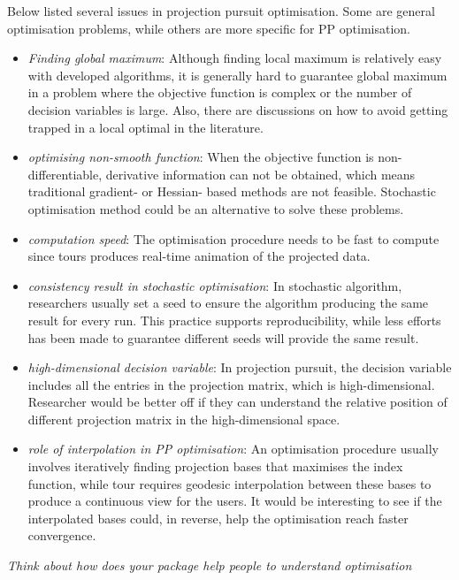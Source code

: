 \documentclass[12pt]{article}
\begin{document}
Below listed several issues in projection pursuit optimisation. Some are
general optimisation problems, while others are more specific for PP
optimisation.

\begin{itemize}
\item
  \emph{Finding global maximum}: Although finding local maximum is
  relatively easy with developed algorithms, it is generally hard to
  guarantee global maximum in a problem where the objective function is
  complex or the number of decision variables is large. Also, there are
  discussions on how to avoid getting trapped in a local optimal in the
  literature.
\item
  \emph{optimising non-smooth function}: When the objective function is
  non-differentiable, derivative information can not be obtained, which
  means traditional gradient- or Hessian- based methods are not
  feasible. Stochastic optimisation method could be an alternative to
  solve these problems.
\item
  \emph{computation speed}: The optimisation procedure needs to be fast
  to compute since tours produces real-time animation of the projected
  data.
\item
  \emph{consistency result in stochastic optimisation}: In stochastic
  algorithm, researchers usually set a seed to ensure the algorithm
  producing the same result for every run. This practice supports
  reproducibility, while less efforts has been made to guarantee
  different seeds will provide the same result.
\item
  \emph{high-dimensional decision variable}: In projection pursuit, the
  decision variable includes all the entries in the projection matrix,
  which is high-dimensional. Researcher would be better off if they can
  understand the relative position of different projection matrix in the
  high-dimensional space.
\item
  \emph{role of interpolation in PP optimisation}: An optimisation
  procedure usually involves iteratively finding projection bases that
  maximises the index function, while tour requires geodesic
  interpolation between these bases to produce a continuous view for the
  users. It would be interesting to see if the interpolated bases could,
  in reverse, help the optimisation reach faster convergence.
\end{itemize}

\emph{Think about how does your package help people to understand
optimisation}
\end{document}
